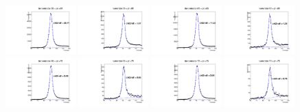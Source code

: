 \documentclass[thesis.tex]{subfiles}
\renewcommand\_{\textunderscore\allowbreak}
\begin{document}
\begin{figure}[hbtp]
   \includegraphics[width=0.24\textwidth]{Figures/Bw_ker_pt_den_55_60.pdf}  \includegraphics[width=0.24\textwidth]{Figures/Bw_ker_pt_num_55_60.pdf}   \includegraphics[width=0.24\textwidth]{Figures/Bw_ker_pt_den_60_65.pdf} \includegraphics[width=0.24\textwidth]{Figures/Bw_ker_pt_num_60_65.pdf} \\
   \includegraphics[width=0.24\textwidth]{Figures/Bw_ker_pt_den_65_70.pdf}  \includegraphics[width=0.24\textwidth]{Figures/Bw_ker_pt_num_65_70.pdf}   \includegraphics[width=0.24\textwidth]{Figures/Bw_ker_pt_den_70_75.pdf} \includegraphics[width=0.24\textwidth]{Figures/Bw_ker_pt_num_70_75.pdf} \\

\end{figure}
\end{document}
